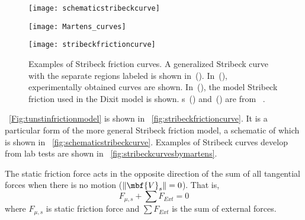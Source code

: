 \begin{figure}
	\begin{minipage}[t]{\linewidth}
		\begin{minipage}[t]{0.32\linewidth}
			\centering
			\texttt{[image: schematicstribeckcurve]}
			\label{fig:schematicstribeckcurve}
		\end{minipage}
		\hfill
		\begin{minipage}[t]{0.32\linewidth}
			\centering
			\texttt{[image: Martens\_curves]}
			\label{fig:stribeckcurvesbymartens}
		\end{minipage}
		\hfill
		\begin{minipage}[t]{0.32\linewidth}
			\centering
			\texttt{[image: stribeckfrictioncurve]}
            \label{fig:stribeckfrictioncurve}
		\end{minipage}
	\end{minipage}
	\caption[Examples of Stribeck friction curves]{Examples of Stribeck friction curves.  A generalized Stribeck curve with the separate regions labeled is shown in~().  In~(), experimentally obtained curves are shown.  In~(), the model Stribeck friction used in the Dixit model is shown.  \figurename{}s~() and~() are from ~\cite{ref:martens2023a}.}
	\label{fig:stribeckfrictioncurveexamples}
\end{figure}
\equationname~\ref{Fig:tunstinfrictionmodel} is shown in \figurename~\ref{fig:stribeckfrictioncurve}.  It is a particular form of the more general Stribeck friction model, a schematic of which is shown in \figurename~\ref{fig:schematicstribeckcurve}.  Examples of Stribeck curves develop from lab tests are shown in \figurename~\ref{fig:stribeckcurvesbymartens}.

The static friction force acts in the opposite direction of the sum of all tangential forces when there is no motion ($\|\mbf{V}_{s}\|=0$).  That is,
\begin{equation}\label{zero}
  F_{\mu,s} + \sum F_{Ext} = 0
\end{equation}
where $F_{\mu,s}$ is static friction force and $\sum F_{Ext}$ is the sum of external forces.


